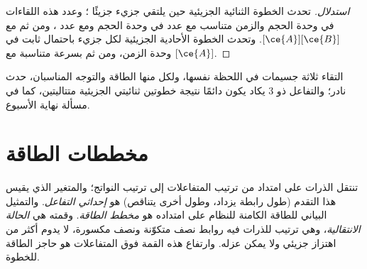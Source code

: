 \begin{proof}[استدلال]
تحدث الخطوة الثنائية الجزيئية حين يلتقي جزيء  جزيئًا ؛ وعدد
هذه اللقاءات في وحدة الحجم والزمن متناسب مع عدد
 في وحدة الحجم ومع عدد ، ومن ثم مع
$[\ce{A}][\ce{B}]$. وتحدث الخطوة الأحادية الجزيئية لكل جزيء باحتمال
ثابت في وحدة الزمن، ومن ثم بسرعة متناسبة مع $[\ce{A}]$.
\end{proof}

\begin{remark}\label{rem:b1:elementary-steps:termolecular}
التقاء ثلاثة جسيمات في اللحظة نفسها، ولكل منها الطاقة والتوجه
المناسبان، حدث نادر؛ والتفاعل ذو  3 يكاد يكون
دائمًا نتيجة خطوتين ثنائيتي الجزيئية متتاليتين، كما في
مسألة نهاية الأسبوع.
\end{remark}

\section{مخططات الطاقة}

\begin{definition}\label{def:b1:elementary-steps:energy-profile}
تنتقل الذرات على امتداد  من ترتيب
المتفاعلات إلى ترتيب النواتج؛ والمتغير الذي يقيس هذا التقدم
(طول رابطة يزداد، وطول أخرى يتناقص) هو \emph{إحداثي
التفاعل}. والتمثيل البياني للطاقة الكامنة
للنظام على امتداده هو \emph{مخطط الطاقة}.
وقمته هي \emph{الحالة الانتقالية}،
وهي ترتيب للذرات فيه روابط نصف متكوّنة
ونصف مكسورة، لا يدوم أكثر من اهتزاز جزيئي ولا يمكن
عزله. وارتفاع هذه القمة فوق المتفاعلات هو
حاجز الطاقة للخطوة.
\end{definition}

